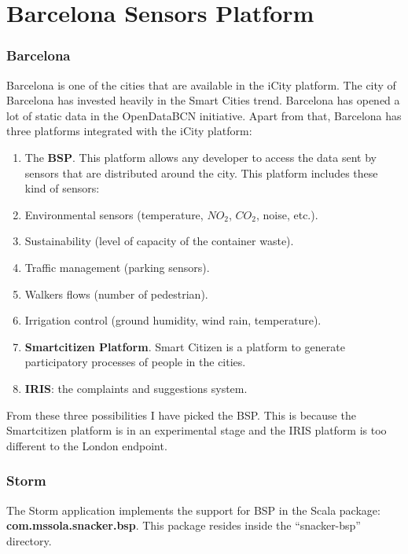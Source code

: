  
\section{Barcelona Sensors Platform}
\label{sec:implementation_bsp}

\subsubsection*{Barcelona}

Barcelona is one of the cities that are available in the iCity platform. The
city of Barcelona has invested heavily in the Smart Cities trend. Barcelona has
opened a lot of static data in the OpenDataBCN initiative. Apart from that,
Barcelona has three platforms integrated with the iCity platform:

\begin{enumerate}
  \itemsep0em
  \item The {\bf \ac{BSP}}. This platform allows any developer
to access the data sent by sensors that are distributed around the city. This
platform includes these kind of sensors:
    \mylist
      \item Environmental sensors (temperature, $NO_2$, $CO_2$, noise, etc.).
      \item Sustainability (level of capacity of the container waste).
      \item Traffic management (parking sensors).
      \item Walkers flows (number of pedestrian).
      \item Irrigation control (ground humidity, wind rain, temperature).
    \mylistend
  \item {\bf Smartcitizen Platform}. Smart Citizen is a platform to generate
participatory processes of people in the cities.
  \item {\bf IRIS}: the complaints and suggestions system.
\end{enumerate}

From these three possibilities I have picked the \ac{BSP}. This is because the
Smartcitizen platform is in an experimental stage and the IRIS platform is too
different to the London endpoint.

\subsubsection*{Storm}

The Storm application implements the support for \ac{BSP} in the Scala package:
{\bf com.mssola.snacker.bsp}. This package resides inside the ``snacker-bsp''
directory.

